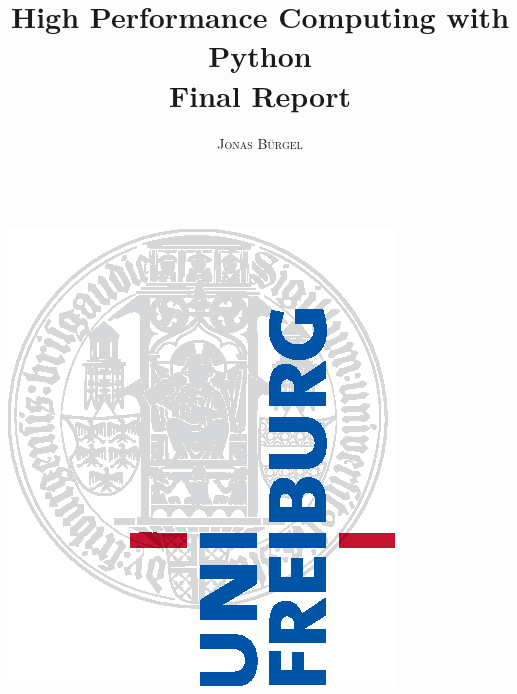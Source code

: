 \documentclass[a4paper,11pt]{report}
\title{\Huge \textbf{High Performance Computing with Python} \vspace{4mm} \\ \huge Final Report}
\author{\textsc{Jonas Bürgel} \\ \vspace{3mm}\text{5500163}  \\
\vspace{3mm}\text{buergelj@tf.uni-freiburg.de}}
\begin{document}
    \makeatletter
    \begin{titlepage}
        \begin{center}
            \includegraphics[width=0.5\linewidth]{logos/Uni_Logo-Grundversion_E1_A4_CMYK.eps}\\[4ex]
            {\huge \bfseries  \@title }\\[2ex]
            {\LARGE  \@author}\\[30ex]
            {\large \@date}
        \end{center}
    \end{titlepage}
    \makeatother
    \thispagestyle{empty}
    \newpage



    \tableofcontents


    
    
    
    
    

    
    
\end{document}
